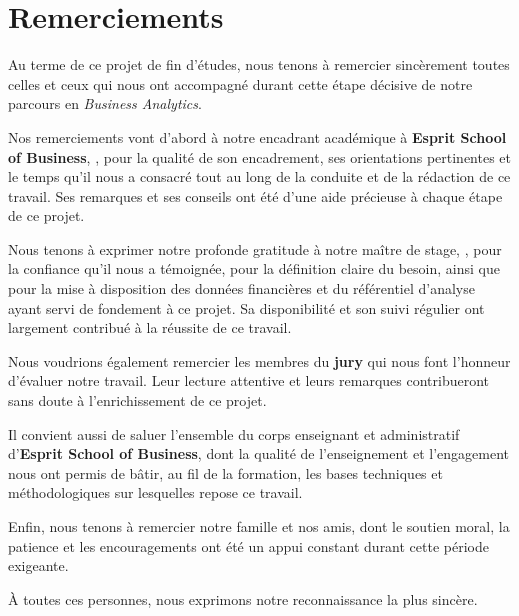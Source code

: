 \chapter*{Remerciements}

\par Au terme de ce projet de fin d'études, nous tenons à remercier
sincèrement toutes celles et ceux qui nous ont accompagné durant cette
étape décisive de notre parcours en \textit{Business Analytics}.

\par Nos remerciements vont d'abord à notre encadrant académique à
\textbf{Esprit School of Business}, \EncadrantAcad{}, pour la qualité de son
encadrement, ses orientations pertinentes et le temps qu'il nous a consacré tout
au long de la conduite et de la rédaction de ce travail. Ses remarques et ses
conseils ont été d'une aide précieuse à chaque étape de ce projet.

\par Nous tenons à exprimer notre profonde gratitude à notre maître de stage,
\MaitreStage{}, pour la confiance qu'il nous a témoignée, pour la définition
claire du besoin, ainsi que pour la mise à disposition des données financières
et du référentiel d'analyse ayant servi de fondement à ce projet. Sa
disponibilité et son suivi régulier ont largement contribué à la réussite de
ce travail.

\par Nous voudrions également remercier les membres du \textbf{jury} qui nous
font l'honneur d'évaluer notre travail. Leur lecture attentive et leurs remarques
contribueront sans doute à l'enrichissement de ce projet.

\par Il convient aussi de saluer l'ensemble du corps enseignant et administratif
d'\textbf{Esprit School of Business}, dont la qualité de l'enseignement et
l'engagement nous ont permis de bâtir, au fil de la formation, les bases
techniques et méthodologiques sur lesquelles repose ce travail.

\par Enfin, nous tenons à remercier notre famille et nos amis, dont le soutien
moral, la patience et les encouragements ont été un appui constant durant cette
période exigeante.

\par À toutes ces personnes, nous exprimons notre reconnaissance la plus
sincère.

\newpage
